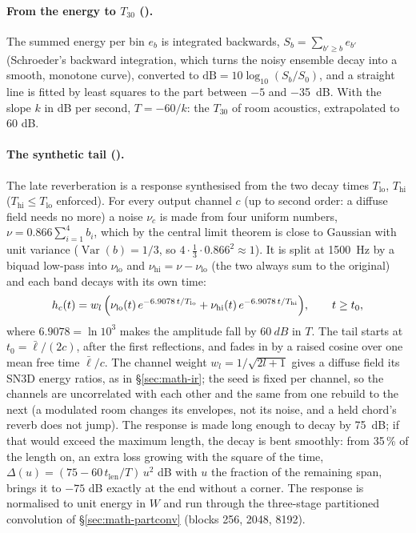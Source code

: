\paragraph{From the energy to $T_{30}$ ().} The summed energy per bin $e_b$ is integrated backwards,
$S_b = \sum_{b'\ge b} e_{b'}$ (Schroeder's backward integration, which turns the noisy ensemble decay into a smooth,
monotone curve), converted to $\mathrm{dB} = 10\log_{10}(S_b/S_0)$, and a straight line is fitted by least squares
to the part between $-5$ and \SI{-35}{dB}. With the slope $k$ in dB per second, $T = -60/k$: the $T_{30}$ of room
acoustics, extrapolated to 60 dB.

\paragraph{The synthetic tail ().} The late reverberation is a response synthesised from the two
decay times $T_\mathrm{lo}$, $T_\mathrm{hi}$ ($T_\mathrm{hi}\le T_\mathrm{lo}$ enforced). For every output channel
$c$ (up to second order: a diffuse field needs no more) a noise $\nu_c$ is made from four uniform numbers,
$\nu = 0.866\sum_{i=1}^4 b_i$, which by the central limit theorem is close to Gaussian with unit variance
($\operatorname{Var}(b) = 1/3$, so $4\cdot\tfrac13\cdot0.866^2 \approx 1$). It is split at \SI{1500}{Hz} by a biquad
low-pass into $\nu_\mathrm{lo}$ and $\nu_\mathrm{hi} = \nu-\nu_\mathrm{lo}$ (the two always sum to the original) and each
band decays with its own time:
\begin{equation}
  h_c(t) = w_l\,\Bigl(\nu_{\mathrm{lo}}(t)\,e^{-6.9078\,t/T_\mathrm{lo}} + \nu_\mathrm{hi}(t)\,e^{-6.9078\,t/T_\mathrm{hi}}\Bigr),
  \qquad t \ge t_0,
\end{equation}
where $6.9078 = \ln 10^3$ makes the amplitude fall by $\SI{60}{dB}$ in $T$. The tail starts at $t_0 = \bar\ell/(2c)$,
after the first reflections, and fades in by a raised cosine over one mean free time $\bar\ell/c$. The channel weight
$w_l = 1/\sqrt{2l+1}$ gives a diffuse field its SN3D energy ratios, as in \S\ref{sec:math-ir}; the seed is fixed per
channel, so the channels are uncorrelated with each other and the same from one rebuild to the next (a modulated room
changes its envelopes, not its noise, and a held chord's reverb does not jump). The response is made long enough to
decay by \SI{75}{dB}; if that would exceed the maximum length, the decay is bent smoothly: from 35\,\% of the length on, an
extra loss growing with the square of the time, $\Delta(u) = (75 - 60\,t_\mathrm{len}/T)\,u^2$ dB with $u$ the
fraction of the remaining span, brings it to $-75$ dB exactly at the end without a corner. The response is normalised to
unit energy in $W$ and run through the three-stage partitioned convolution of \S\ref{sec:math-partconv}
(blocks 256, 2048, 8192).

